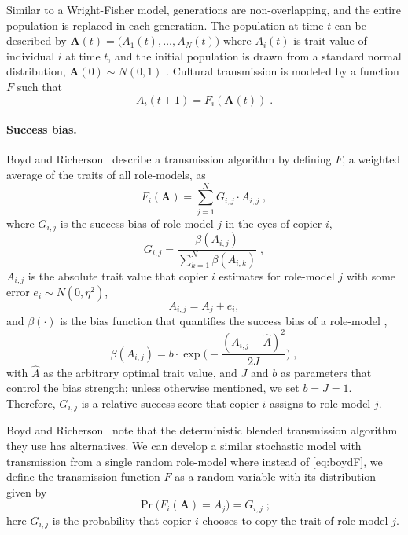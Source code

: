 \documentclass[12pt]{extarticle}
\let\vec\mathbf
\begin{document}
Similar to a Wright-Fisher model, generations are non-overlapping, and the entire population is replaced in each generation.
The population at time $t$ can be described by $\vec{A}(t)=\big(A_{1}(t), \ldots, A_{N}(t)\big)$ where $A_{i}(t)$ is trait value of individual $i$ at time $t$, and  the initial population is drawn from a standard normal distribution, $\vec{A}(0) \sim N(0,1)$ .
Cultural transmission is modeled by a function $F$ such that 
\begin{equation}\label{eq:transmission}
A_{i}(t+1) = F_i(\vec{A}(t)) \;.
\end{equation}

\paragraph{Success bias.}
Boyd and Richerson~\citep[Ch.~8, p.~247-249]{evolutionBook} describe a  transmission algorithm by defining $F$, a weighted average of the traits of all role-models, as
\begin{equation}\label{eq:boydF}
F_i(\vec{A}) = \sum_{j=1}^N G_{i,j}\cdot A_{i,j} \;, 
\end{equation}
where $G_{i,j}$ is the success bias of role-model $j$ in the eyes of copier $i$,
\begin{equation}\label{eq:boydG}
G_{i,j} = \frac{\beta(A_{i,j})}{\sum_{k=1}^{N} \beta(A_{i,k})} \;,
\end{equation}
$A_{i,j}$ is the absolute trait value {that} copier $i$ estimates for role-model $j$ with some error $e_i \sim N(0,\eta^2)$,
\begin{equation}\label{eq:relativeTrait}
A_{i,j} = A_j + e_i,
\end{equation}
and $\beta(\cdot)$ is the bias function that quantifies the success bias of a role-model \citep[eq.~5.11]{evolutionBook},
\begin{equation}\label{eq:success_bias}
\beta(A_{i,j}) = b \cdot \exp{\Big(-\frac{(A_{i,j} - \hat{A})^2}{2J}\Big)} \;,
\end{equation} 
with $\hat{A}$ as the arbitrary optimal trait value, and $J$ and $b$ as parameters that control the bias strength; unless otherwise mentioned, we set $b=J=1$.
Therefore, $G_{i,j}$ is a relative success score that copier $i$ assigns to role-model $j$.

Boyd and Richerson~\citep{evolutionBook} note that the deterministic blended transmission algorithm they use has alternatives. We {can} develop a similar stochastic model with transmission from a single random role-model where instead of \cref{eq:boydF}, we define the transmission function $F$ as a random variable with its distribution given by 
\begin{equation}\label{eq:ourF}
\Pr\big(F_i(\vec{A}) = A_{j}\big) = G_{i,j} \;;
\end{equation}
{here $G_{i,j}$ is} the probability {that copier $i$ chooses} to copy the trait of role-model $j$.
\end{document}
